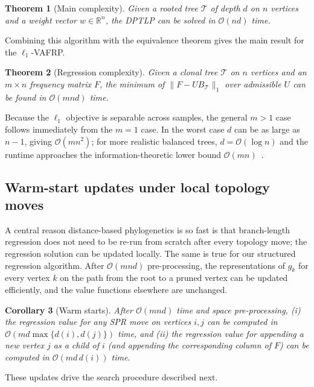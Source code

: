 \documentclass[11pt]{article}
\newtheorem{theorem}{Theorem}
\newtheorem{corollary}[theorem]{Corollary}
\begin{document}
\begin{theorem}[Main complexity]
Given a rooted tree $\mathcal{T}$ of depth $d$ on $n$ vertices and a weight vector $w\in\mathbb{R}^n$, the DPTLP can be solved in $\mathcal{O}(nd)$ time.
\end{theorem}

Combining this algorithm with the equivalence theorem gives the main result for the $\ell_1$-VAFRP.

\begin{theorem}[Regression complexity]
Given a clonal tree $\mathcal{T}$ on $n$ vertices and an $m \times n$ frequency matrix $F$, the minimum of $\|F - UB_{\mathcal{T}}\|_1$ over admissible $U$ can be found in $\mathcal{O}(mnd)$ time.
\end{theorem}

Because the $\ell_1$ objective is separable across samples, the general $m > 1$ case follows immediately from the $m=1$ case. In the worst case $d$ can be as large as $n-1$, giving $\mathcal{O}(mn^2)$; for more realistic balanced trees, $d = \mathcal{O}(\log n)$ and the runtime approaches the information-theoretic lower bound $\mathcal{O}(mn)$~\citep{elkebir2015reconstruction}.

\subsection{Warm-start updates under local topology moves}

A central reason distance-based phylogenetics is so fast is that branch-length regression does not need to be re-run from scratch after every topology move; the regression solution can be updated locally. The same is true for our structured regression algorithm. After $\mathcal{O}(mnd)$ pre-processing, the representations of $g_k$ for every vertex $k$ on the path from the root to a pruned vertex can be updated efficiently, and the value functions elsewhere are unchanged.

\begin{corollary}[Warm starts]
After $\mathcal{O}(mnd)$ time and space pre-processing,
(i) the regression value for any SPR move on vertices $i, j$ can be computed in $\mathcal{O}(md\max\{d(i), d(j)\})$ time, and
(ii) the regression value for appending a new vertex $j$ as a child of $i$ (and appending the corresponding column of $F$) can be computed in $\mathcal{O}(md\,d(i))$ time.
\end{corollary}

These updates drive the search procedure described next.
\end{document}
